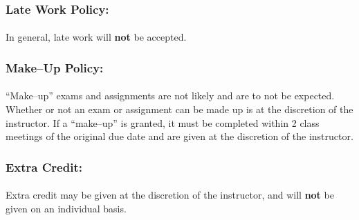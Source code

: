 \documentclass{article}
\begin{document}

      \subsubsection*{Late Work Policy:}
        \paragraph*{}
        In general, late work will \textbf{not} be accepted.


      \subsubsection*{Make--Up Policy:}
        \paragraph*{}
        ``Make--up'' exams and assignments are not likely and are to not be expected.
        Whether or not an exam or assignment can be made up is at the discretion of the instructor.
        If a ``make--up'' is granted, it must be completed within 2 class meetings of the original due date and are given at the discretion of the instructor.


      \subsubsection*{Extra Credit:}
        \paragraph*{}
        Extra credit may be given at the discretion of the instructor, and will \textbf{not} be given on an individual basis.

\end{document}
